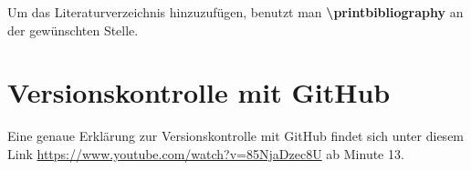 \documentclass[a4paper, 12pt]{scrreprt}
\begin{document}
\noindent Um das Literaturverzeichnis hinzuzufügen, benutzt man \textbf{\textbackslash printbibliography} an der gewünschten Stelle.



\chapter{Versionskontrolle mit GitHub}
Eine genaue Erklärung zur Versionskontrolle mit GitHub findet sich unter diesem Link \href{https://www.youtube.com/watch?v=85NjaDzec8U}{https://www.youtube.com/watch?v=85NjaDzec8U}  ab Minute 13.

\printbibliography
\end{document}
